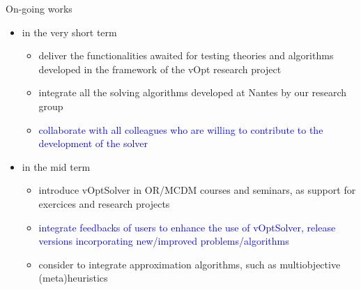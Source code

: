 \documentclass[10pt,xcolor=dvipsnames]{beamer}
\newcommand{\blue}{\textcolor{blue}}
\begin{document}
\begin{frame}{On-going works}

\begin{itemize}

\item in the very short term 
\begin{itemize}
    \item deliver the functionalities awaited for testing theories and algorithms developed in the framework of the vOpt research project
             \smallskip
    \item integrate all the solving algorithms developed at Nantes by our research group    
             \smallskip
    \item \blue{collaborate with all colleagues who are willing to contribute to the  development of the solver}
 \end{itemize}    
\medskip

\item in the mid term 
\begin{itemize}
    \item introduce vOptSolver in OR/MCDM courses and seminars, as support for exercices and research projects
              \smallskip
    \item \blue{integrate feedbacks of users to enhance the use of vOptSolver, release versions incorporating new/improved problems/algorithms}    
                  \smallskip
    \item consider to integrate approximation algorithms, such as multiobjective (meta)heuristics
 \end{itemize}  
    
\end{itemize}

\end{frame}

\end{document}
